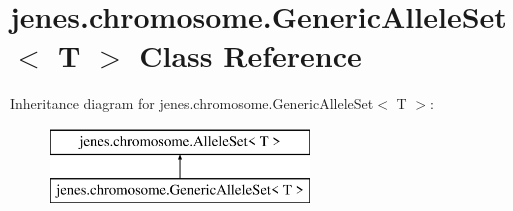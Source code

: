 \hypertarget{classjenes_1_1chromosome_1_1_generic_allele_set_3_01_t_01_4}{\section{jenes.\-chromosome.\-Generic\-Allele\-Set$<$ T $>$ Class Reference}
\label{classjenes_1_1chromosome_1_1_generic_allele_set_3_01_t_01_4}
}
Inheritance diagram for jenes.\-chromosome.\-Generic\-Allele\-Set$<$ T $>$\-:\begin{figure}[H]
\begin{center}
\leavevmode
\includegraphics[height=2.000000cm]{classjenes_1_1chromosome_1_1_generic_allele_set_3_01_t_01_4}
\end{center}
\end{figure}
